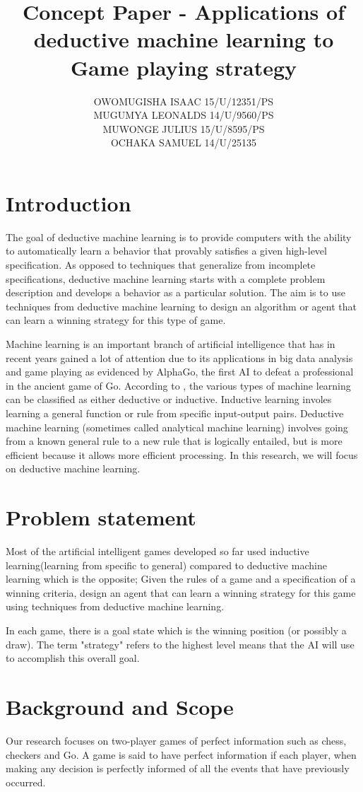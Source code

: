 \documentclass[11pt]{article}
\title{Concept Paper - Applications of deductive machine learning to Game playing strategy}
\author{OWOMUGISHA ISAAC \hspace{1cm}15/U/12351/PS\\ MUGUMYA LEONALDS \hspace{1cm} 14/U/9560/PS\\MUWONGE JULIUS \hspace{1cm} 15/U/8595/PS \\ OCHAKA SAMUEL \hspace{1cm} 14/U/25135}
\date{}
\begin{document}
\maketitle

\section{Introduction}
The goal of deductive machine learning is to provide computers with the ability to automatically learn a behavior that provably satisfies a given high-level specification. As opposed to techniques that generalize from incomplete specifications, deductive machine learning starts with a complete problem description and develops a behavior as a particular solution. The aim is to use techniques from deductive machine learning to design an algorithm or agent that can learn a winning strategy for this type of game.

Machine learning is an important branch of artificial intelligence that has in recent years gained a lot of attention due to its applications in big data analysis and game playing as evidenced by AlphaGo, the first AI to defeat a professional in the ancient game of Go.
According to \cite{russell2010artificial}, the various types of machine learning can be classified as either deductive or inductive. Inductive learning involes learning a general function or rule from specific input-output pairs. Deductive machine learning (sometimes called analytical machine learning) involves going from a known general rule to a new rule that is logically entailed, but is more efficient because it allows more efficient processing. In this research, we will focus on deductive machine learning.

\section{Problem statement}
Most of the artificial intelligent games developed so far used inductive learning(learning from specific to general) compared to deductive machine learning which is the opposite; Given the rules of a game and a specification of a winning criteria, design an agent that can learn a winning strategy for this game using techniques from deductive machine learning.

In each game, there is a goal state which is the winning position (or possibly a draw). The term "strategy" refers to the highest level means that the AI will use to accomplish this overall goal.
\section{Background and Scope}
Our research focuses on two-player games of perfect information such as chess, checkers and Go. A game is said to have perfect information if each player, when making any decision is perfectly informed of all the events that have previously occurred. 
\end{document}
